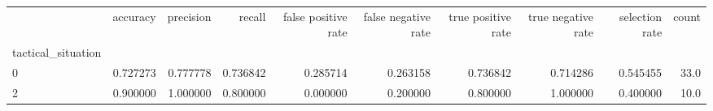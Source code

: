 \begin{tabular}{lrrrrrrrrr}
\toprule
{} &  accuracy &  precision &    recall &  false positive rate &  false negative rate &  true positive rate &  true negative rate &  selection rate &  count \\
tactical\_situation &           &            &           &                      &                      &                     &                     &                 &        \\
\midrule
0                  &  0.727273 &   0.777778 &  0.736842 &             0.285714 &             0.263158 &            0.736842 &            0.714286 &        0.545455 &   33.0 \\
2                  &  0.900000 &   1.000000 &  0.800000 &             0.000000 &             0.200000 &            0.800000 &            1.000000 &        0.400000 &   10.0 \\
\bottomrule
\end{tabular}
